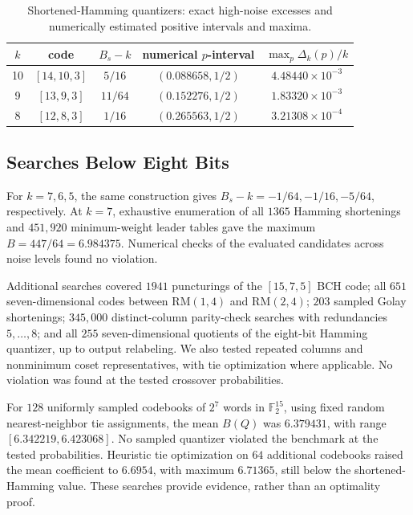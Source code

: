 \begin{table}[t]
\caption{Shortened-Hamming quantizers: exact high-noise excesses
and numerically estimated positive intervals and maxima.}
\label{tab:shortened-hamming}
\centering
{\footnotesize\setlength{\tabcolsep}{7pt}\renewcommand{\arraystretch}{1.12}
\begin{tabular}{@{}ccccc@{}}
\toprule
\(k\) & code & \(B_s-k\) & numerical \(p\)-interval
& \(\max_p\Delta_k(p)/k\) \\ \midrule
10 & \([14,10,3]\) & \(5/16\)
& \((0.088658,1/2)\) & \(4.48440\!\times\!10^{-3}\) \\
9 & \([13,9,3]\) & \(11/64\)
& \((0.152276,1/2)\) & \(1.83320\!\times\!10^{-3}\) \\
8 & \([12,8,3]\) & \(1/16\)
& \((0.265563,1/2)\) & \(3.21308\!\times\!10^{-4}\) \\
\bottomrule
\end{tabular}}
\end{table}

\subsection{Searches Below Eight Bits}
\label{subsec:below-eight-searches}

For \(k=7,6,5\), the same construction gives
\(B_s-k=-1/64,-1/16,-5/64\), respectively.
At \(k=7\), exhaustive enumeration of all \(1365\) Hamming shortenings
and \(451{,}920\) minimum-weight leader tables gave the maximum
\(B=447/64=6.984375\). Numerical checks of the evaluated candidates
across noise levels found no violation.

Additional searches covered \(1941\) puncturings of the \([15,7,5]\)
BCH code; all \(651\) seven-dimensional codes between
\(\mathrm{RM}(1,4)\) and \(\mathrm{RM}(2,4)\);
\(203\) sampled Golay shortenings;
\(345{,}000\) distinct-column parity-check searches with redundancies
\(5,\ldots,8\); and all \(255\) seven-dimensional quotients of the
eight-bit Hamming quantizer, up to output relabeling. We also tested
repeated columns and
nonminimum coset representatives, with tie optimization where applicable.
No violation was found at the tested crossover probabilities.

For \(128\) uniformly sampled codebooks of \(2^7\) words in
\(\mathbb F_2^{15}\), using fixed random nearest-neighbor tie assignments,
the mean \(B(Q)\) was \(6.379431\), with range
\([6.342219,6.423068]\). No sampled quantizer violated the benchmark
at the tested probabilities. Heuristic tie optimization on \(64\)
additional codebooks raised the mean coefficient to \(6.6954\),
with maximum \(6.71365\), still below the shortened-Hamming value.
These searches provide evidence, rather than an optimality proof.

